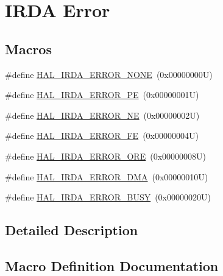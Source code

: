 \hypertarget{group___i_r_d_a___error}{}\section{I\+R\+DA Error}
\label{group___i_r_d_a___error}
\subsection*{Macros}
\begin{DoxyCompactItemize}
\item 
\#define \hyperlink{group___i_r_d_a___error_ga5e2f0a4853b89feb89395d6447c7278c}{H\+A\+L\+\_\+\+I\+R\+D\+A\+\_\+\+E\+R\+R\+O\+R\+\_\+\+N\+O\+NE}~(0x00000000\+U)
\item 
\#define \hyperlink{group___i_r_d_a___error_ga6d09c3b0aa03defa115a9b35b4b11d15}{H\+A\+L\+\_\+\+I\+R\+D\+A\+\_\+\+E\+R\+R\+O\+R\+\_\+\+PE}~(0x00000001\+U)
\item 
\#define \hyperlink{group___i_r_d_a___error_ga96fa3b5489256dc0a05d6d7008b7bc36}{H\+A\+L\+\_\+\+I\+R\+D\+A\+\_\+\+E\+R\+R\+O\+R\+\_\+\+NE}~(0x00000002\+U)
\item 
\#define \hyperlink{group___i_r_d_a___error_gac4cc028071c9f67eadfb1ea272f61b07}{H\+A\+L\+\_\+\+I\+R\+D\+A\+\_\+\+E\+R\+R\+O\+R\+\_\+\+FE}~(0x00000004\+U)
\item 
\#define \hyperlink{group___i_r_d_a___error_ga452db15804671ee712e2943fb7eebbc8}{H\+A\+L\+\_\+\+I\+R\+D\+A\+\_\+\+E\+R\+R\+O\+R\+\_\+\+O\+RE}~(0x00000008\+U)
\item 
\#define \hyperlink{group___i_r_d_a___error_ga3283f5c73025352c4933d3c42f9ef77d}{H\+A\+L\+\_\+\+I\+R\+D\+A\+\_\+\+E\+R\+R\+O\+R\+\_\+\+D\+MA}~(0x00000010\+U)
\item 
\#define \hyperlink{group___i_r_d_a___error_ga9c9b7ae8370604df59988c82a5abb357}{H\+A\+L\+\_\+\+I\+R\+D\+A\+\_\+\+E\+R\+R\+O\+R\+\_\+\+B\+U\+SY}~(0x00000020\+U)
\end{DoxyCompactItemize}


\subsection{Detailed Description}


\subsection{Macro Definition Documentation}
\mbox{\label{group___i_r_d_a___error_ga9c9b7ae8370604df59988c82a5abb357}} 
